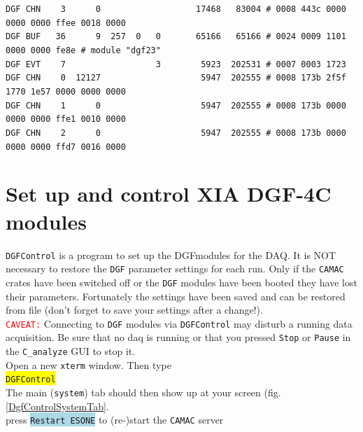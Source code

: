 \documentclass[10pt]{article}
\newcommand{\blue}[1]{\colorbox{lightblue}{\texttt{#1}}}
\newcommand{\yellow}[1]{\colorbox{yellow}{\texttt{#1}}}
\newcommand{\redt}[1]{\textcolor{red}{\texttt{#1}}}
\newenvironment{yellowboxed}
	{\begin{Sbox}\begin{minipage}[t]}
	{\end{minipage}\end{Sbox}\colorbox{yellow}{\TheSbox}}
\begin{document}
{\begin{yellowboxed}{\linewidth}
\verb+DGF CHN    3      0                   17468   83004 # 0008 443c 0000 0000 0000 ffee 0018 0000+\\
\verb+DGF BUF   36      9  257  0   0       65166   65166 # 0024 0009 1101 0000 0000 fe8e # module "dgf23"+\\
\verb+DGF EVT    7                  3        5923  202531 # 0007 0003 1723+\\
\verb+DGF CHN    0  12127                    5947  202555 # 0008 173b 2f5f 1770 1e57 0000 0000 0000+\\
\verb+DGF CHN    1      0                    5947  202555 # 0008 173b 0000 0000 0000 ffe1 0010 0000+\\
\verb+DGF CHN    2      0                    5947  202555 # 0008 173b 0000 0000 0000 ffd7 0016 0000+\\
\end{yellowboxed}}

\newpage
\section{Set up and control XIA DGF-4C modules}\vspace{3mm}

\texttt{DGFControl} is a program to set up the DGFmodules for the DAQ.
It is NOT necessary to restore the \texttt{DGF} parameter settings for each run.
Only if the \texttt{CAMAC} crates have been switched off or the \texttt{DGF} modules have been booted
they have lost their parameters.
Fortunately the settings have been saved and can be restored from file
(don't forget to save your settings after a change!).\\

\redt{CAVEAT:}
Connecting to \texttt{DGF} modules via \texttt{DGFControl} may disturb a running data acquisition.
Be sure that no daq is running or that you pressed \texttt{Stop} or \texttt{Pause} in the \texttt{C\_analyze} GUI to stop it.\\


Open a new \texttt{xterm} window. Then type\\

\hspace*{.2\linewidth}\yellow{DGFControl}\\

The main (\texttt{system}) tab should then show up at your screen (fig. \ref{DgfControlSystemTab}.\\

\hspace*{.2\linewidth}press \blue{Restart ESONE} to (re-)start the \texttt{CAMAC} server\\
\end{document}
